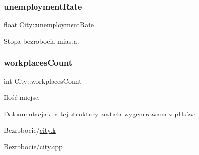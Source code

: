 \subsubsection{\texorpdfstring{unemploymentRate}{unemploymentRate}}
{\footnotesize\ttfamily float City\+::unemployment\+Rate}



Stopa bezrobocia miasta. 

\mbox{\label{struct_city_a6dcb0f31c0917f9be11c312098c62c23}} 
\subsubsection{\texorpdfstring{workplacesCount}{workplacesCount}}
{\footnotesize\ttfamily int City\+::workplaces\+Count}



Ilość miejsc. 



Dokumentacja dla tej struktury została wygenerowana z plików\+:\begin{DoxyCompactItemize}
\item 
Bezrobocie/\mbox{\hyperlink{city_8h}{city.\+h}}\item 
Bezrobocie/\mbox{\hyperlink{city_8cpp}{city.\+cpp}}\end{DoxyCompactItemize}
